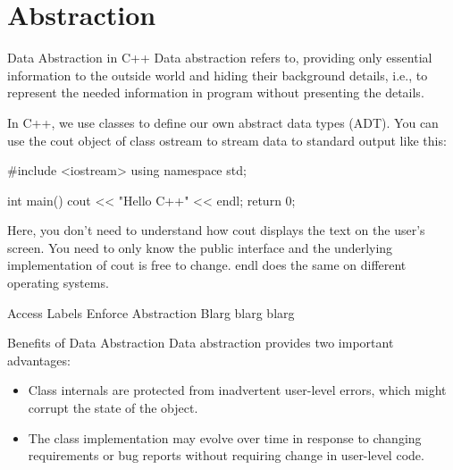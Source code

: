 \documentclass[../lecture5-objectorientation.tex]{subfiles}
\begin{document}
\section{Abstraction}


\begin{frame}[fragile]{Data Abstraction in C++}
    Data abstraction refers to, providing only essential information to the outside world and hiding their background details, i.e., to represent the needed information in program without presenting the details. \newline

    In C++, we use classes to define our own abstract data types (ADT). You can use the cout object of class ostream to stream data to standard output like this: \newline

    \begin{cppcode}[lastline=8]
#include <iostream>
using namespace std;

int main()
{
    cout << "Hello C++" << endl;
    return 0;
}
    \end{cppcode}

    \note
    {
        Here, you don't need to understand how cout displays the text on the user's screen. You need to only know the public interface and the underlying implementation of cout is free to change. endl does the same on different operating systems.
    }
\end{frame}


\begin{frame}[fragile]{Access Labels Enforce Abstraction}
    Blarg blarg blarg
\end{frame}


\begin{frame}[fragile]{Benefits of Data Abstraction}
    Data abstraction provides two important advantages:

    \begin{itemize}
        \item Class internals are protected from inadvertent user-level errors, which might corrupt the state of the object.
        \item The class implementation may evolve over time in response to changing requirements or bug reports without requiring change in user-level code.
    \end{itemize}
\end{frame}
\end{document}
